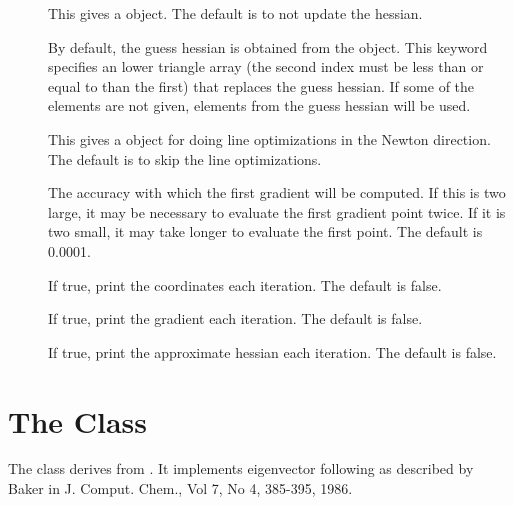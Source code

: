 \begin{description}
  \item[] This gives a  object.
     The default is to not update the hessian.

  \item[] By default, the guess hessian is obtained from the
      object.  This keyword specifies an lower triangle
     array (the second index must be less than or equal to than the first)
     that replaces the guess hessian.  If some of the elements are not
     given, elements from the guess hessian will be used.

  \item[] This gives a  object for doing
     line optimizations in the Newton direction.  The default is to skip
     the line optimizations.

  \item[] The accuracy with which the first gradient will
     be computed.  If this is two large, it may be necessary to evaluate
     the first gradient point twice.  If it is two small, it may take
     longer to evaluate the first point. The default is 0.0001.

  \item[] If true, print the coordinates each iteration.
     The default is false.

  \item[] If true, print the gradient each
    iteration. The default is false.

  \item[] If true, print the approximate hessian each
    iteration. The default is false.

\end{description}


\section{The  Class}\label{EFCOpt}

The  class derives from .  It implements
eigenvector following as described by Baker in J. Comput. Chem., Vol 7, No
4, 385-395, 1986.

